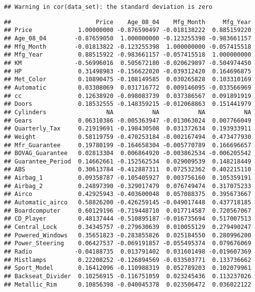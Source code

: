 \documentclass[]{article}
\begin{document}
\begin{verbatim}
## Warning in cor(data_set): the standard deviation is zero
\end{verbatim}

\begin{verbatim}
##                        Price    Age_08_04    Mfg_Month     Mfg_Year
## Price             1.00000000 -0.876590497 -0.018138222  0.885159220
## Age_08_04        -0.87659050  1.000000000 -0.123255398 -0.983661157
## Mfg_Month        -0.01813822 -0.123255398  1.000000000 -0.057415518
## Mfg_Year          0.88515922 -0.983661157 -0.057415518  1.000000000
## KM               -0.56996016  0.505672180 -0.020629897 -0.504974450
## HP                0.31498983 -0.156622020 -0.039312420  0.164696875
## Met_Color         0.10890475 -0.108149585  0.030265828  0.103310169
## Automatic         0.03308069  0.031716772  0.009146095 -0.033566969
## cc                0.12638920 -0.098083739  0.037386567  0.091891919
## Doors             0.18532555 -0.148359215 -0.012068863  0.151441979
## Cylinders                 NA           NA           NA           NA
## Gears             0.06310386 -0.005363947 -0.013063024  0.007766049
## Quarterly_Tax     0.21919691 -0.198430508  0.031372634  0.193933911
## Weight            0.58119759 -0.470253184 -0.002167494  0.473477930
## Mfr_Guarantee     0.19780199 -0.164658304 -0.005770789  0.166696657
## BOVAG_Guarantee   0.02813304  0.006864920 -0.003862534 -0.006205542
## Guarantee_Period  0.14662661 -0.152562534  0.029009539  0.148218449
## ABS               0.30613784 -0.412887311  0.072532362  0.402215110
## Airbag_1          0.09358787 -0.105405927  0.003756160  0.105359191
## Airbag_2          0.24897390 -0.329017479  0.076749474  0.317075233
## Airco             0.42925943 -0.403600048  0.057088375  0.395673667
## Automatic_airco   0.58826200 -0.426259145 -0.049017448  0.437718185
## Boardcomputer     0.60129196 -0.719448710  0.017714587  0.720567067
## CD_Player         0.48137444 -0.510895187 -0.016735694  0.517007513
## Central_Lock      0.34345757 -0.279630639  0.010055129  0.279490247
## Powered_Windows   0.35651823 -0.283855826  0.025184550  0.280996200
## Power_Steering    0.06427537 -0.069191857 -0.055495374  0.079676069
## Radio            -0.04188735  0.013791402  0.031601498 -0.019607369
## Mistlamps         0.22208252 -0.126894569 -0.033503771  0.133736662
## Sport_Model       0.16412096 -0.110988319  0.052789203  0.102079961
## Backseat_Divider  0.10256915 -0.116751059  0.023245436  0.113237026
## Metallic_Rim      0.10856398 -0.040045378  0.023506472  0.036022122

\end{verbatim}
\end{document}
